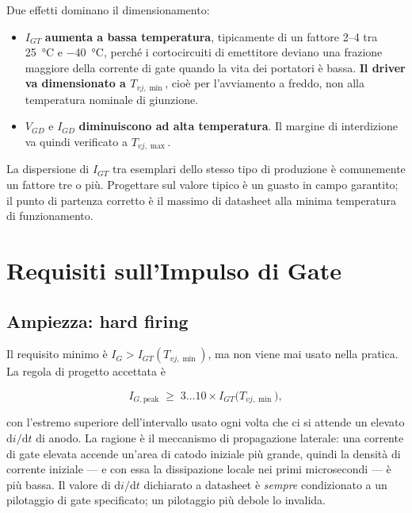 \documentclass[11pt,a4paper]{article}
\begin{document}
Due effetti dominano il dimensionamento:

\begin{itemize}
  \item $I_{GT}$ \textbf{aumenta a bassa temperatura}, tipicamente di un fattore
        \numrange{2}{4} tra \SI{25}{\celsius} e \SI{-40}{\celsius}, perché i
        cortocircuiti di emettitore deviano una frazione maggiore della corrente di
        gate quando la vita dei portatori è bassa. \textbf{Il driver va dimensionato
        a $T_{vj,\min}$}, cioè per l'avviamento a freddo, non alla temperatura
        nominale di giunzione.
  \item $V_{GD}$ e $I_{GD}$ \textbf{diminuiscono ad alta temperatura}. Il margine di
        interdizione va quindi verificato a $T_{vj,\max}$.
\end{itemize}

La dispersione di $I_{GT}$ tra esemplari dello stesso tipo di produzione è
comunemente un fattore tre o più. Progettare sul valore tipico è un guasto in campo
garantito; il punto di partenza corretto è il massimo di datasheet alla minima
temperatura di funzionamento.

\section{Requisiti sull'Impulso di Gate}

\subsection{Ampiezza: hard firing}

Il requisito minimo è $I_G > I_{GT}(T_{vj,\min})$, ma non viene mai usato nella
pratica. La regola di progetto accettata è

\begin{equation}
  I_{G,\text{peak}} \;\ge\; 3 \dots 10 \times I_{GT}\big(T_{vj,\min}\big),
  \label{eq:amp}
\end{equation}

con l'estremo superiore dell'intervallo usato ogni volta che ci si attende un
elevato $\mathrm{d}i/\mathrm{d}t$ di anodo. La ragione è il meccanismo di
propagazione laterale: una corrente di gate elevata accende un'area di catodo
iniziale più grande, quindi la densità di corrente iniziale --- e con essa la
dissipazione locale nei primi microsecondi --- è più bassa. Il valore di
$\mathrm{d}i/\mathrm{d}t$ dichiarato a datasheet è \emph{sempre} condizionato a un
pilotaggio di gate specificato; un pilotaggio più debole lo invalida.
\end{document}
